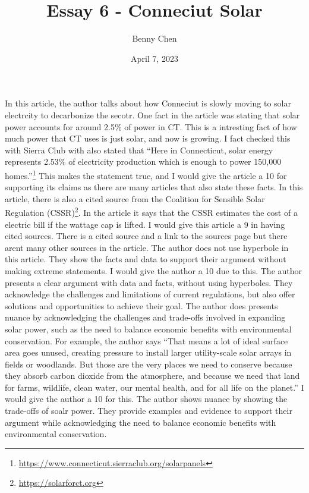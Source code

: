 \documentclass{article}
\title{Essay 6 - Conneciut Solar}
\author{Benny Chen}
\date{April 7, 2023}
\begin{document}
\maketitle


In this article, the author talks about how Conneciut is slowly moving to solar electrcity to decarbonize the secotr. One fact in the article was stating that solar power accounts for around 2.5\% of power in CT. This is a intresting fact of how much power that CT uses is just solar, and now is growing. I fact checked this with Sierra Club with also stated that ``Here in Connecticut, solar energy represents 2.53\% of electricity production which is enough to power 150,000 homes.''\footnote[1]{\url{https://www.connecticut.sierraclub.org/solarpanels}} This makes the statement true, and I would give the article a 10 for supporting its claims as there are many articles that also state these facts. In this article, there is also a cited source from the Coalition for Sensible Solar Regulation (CSSR)\footnote[2]{\url{https://solarforct.org}}. In the article it says that the CSSR estimates the cost of a electric bill if the wattage cap is lifted. I would give this article a 9 in having cited sources. There is a cited source and a link to the sources page but there arent many other sources in the article. The author does not use hyperbole in this article. They show the facts and data to support their argument without making extreme statements. I would give the author a 10 due to this. The author presents a clear argument with data and facts, without using hyperboles. They acknowledge the challenges and limitations of current regulations, but also offer solutions and opportunities to achieve their goal. The author does presents nuance by acknowledging the challenges and trade-offs involved in expanding solar power, such as the need to balance economic benefits with environmental conservation. For example, the author says ``That means a lot of ideal surface area goes unused, creating pressure to install larger utility-scale solar arrays in fields or woodlands. But those are the very places we need to conserve because they absorb carbon dioxide from the atmosphere, and because we need that land for farms, wildlife, clean water, our mental health, and for all life on the planet.'' I would give the author a 10 for this. The author shows nuance by showing the trade-offs of soalr power. They provide examples and evidence to support their argument while acknowledging the need to balance economic benefits with environmental conservation. 
\end{document}
